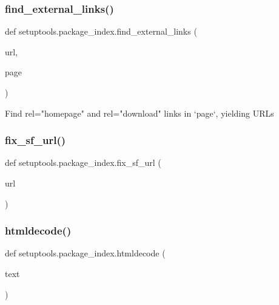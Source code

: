 \subsubsection{\texorpdfstring{find\+\_\+external\+\_\+links()}{find\_external\_links()}}
{\footnotesize\ttfamily def setuptools.\+package\+\_\+index.\+find\+\_\+external\+\_\+links (\begin{DoxyParamCaption}\item[{}]{url,  }\item[{}]{page }\end{DoxyParamCaption})}

\begin{DoxyVerb}Find rel="homepage" and rel="download" links in `page`, yielding URLs\end{DoxyVerb}
 \mbox{\label{namespacesetuptools_1_1package__index_a54de460bc10958fb74c9773ce7411128}} 
\subsubsection{\texorpdfstring{fix\+\_\+sf\+\_\+url()}{fix\_sf\_url()}}
{\footnotesize\ttfamily def setuptools.\+package\+\_\+index.\+fix\+\_\+sf\+\_\+url (\begin{DoxyParamCaption}\item[{}]{url }\end{DoxyParamCaption})}

\mbox{\label{namespacesetuptools_1_1package__index_a31f99bcf1ac5bfd133a96d93a1172078}} 
\subsubsection{\texorpdfstring{htmldecode()}{htmldecode()}}
{\footnotesize\ttfamily def setuptools.\+package\+\_\+index.\+htmldecode (\begin{DoxyParamCaption}\item[{}]{text }\end{DoxyParamCaption})}

